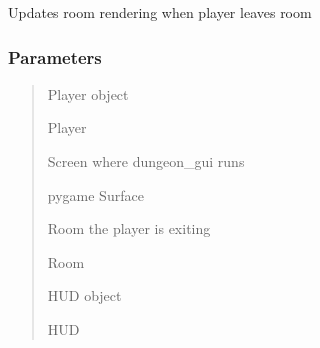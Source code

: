 \documentclass[letterpaper,10pt,english]{sphinxmanual}
\begin{document}

\begin{fulllineitems}
\label{\detokenize{api_reference/dungeon_resolver/GUI:GUI.exit_room}}
\pysigstartsignatures
{}
\pysigstopsignatures
\sphinxAtStartPar
Updates room rendering when player leaves room


\subsubsection{Parameters}
\label{\detokenize{api_reference/dungeon_resolver/GUI:id1}}\begin{quote}\begin{description}
\sphinxAtStartPar
Player object

\sphinxAtStartPar
Player

\sphinxAtStartPar
Screen where dungeon\_gui runs

\sphinxAtStartPar
pygame Surface

\sphinxAtStartPar
Room the player is exiting

\sphinxAtStartPar
Room

\sphinxAtStartPar
HUD object

\sphinxAtStartPar
HUD

\end{description}\end{quote}

\end{fulllineitems}

\end{document}
